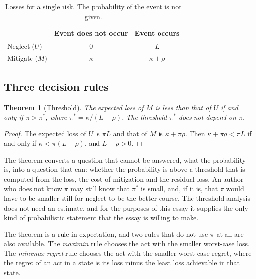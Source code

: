 \documentclass[11pt]{article}
\theoremstyle{plain}
\newtheorem{theorem}{Theorem}[section]
\theoremstyle{definition}
\theoremstyle{remark}
\begin{document}
\begin{table}[ht]
\centering
\small
\begin{tabular}{@{}lcc@{}}
\toprule
 & Event does not occur & Event occurs \\
\midrule
Neglect ($U$) & $0$ & $L$ \\
Mitigate ($M$) & $\kappa$ & $\kappa+\rho$ \\
\bottomrule
\end{tabular}
\caption{Losses for a single risk. The probability of the event is not given.}
\label{tab:risk}
\end{table}

\subsection{Three decision rules}

\begin{theorem}[Threshold]\label{thm:threshold}
The expected loss of $M$ is less than that of $U$ if and only if $\pi>\pi^{*}$, where $\pi^{*}=\kappa/(L-\rho)$. The threshold $\pi^{*}$ does not depend on $\pi$.
\end{theorem}

\begin{proof}
The expected loss of $U$ is $\pi L$ and that of $M$ is $\kappa+\pi\rho$. Then $\kappa+\pi\rho<\pi L$ if and only if $\kappa<\pi(L-\rho)$, and $L-\rho>0$. \qedhere
\end{proof}

The theorem converts a question that cannot be answered, what the probability is, into a question that can: whether the probability is above a threshold that is computed from the loss, the cost of mitigation and the residual loss. An author who does not know $\pi$ may still know that $\pi^{*}$ is small, and, if it is, that $\pi$ would have to be smaller still for neglect to be the better course. The threshold analysis does not need an estimate, and for the purposes of this essay it supplies the only kind of probabilistic statement that the essay is willing to make.

The theorem is a rule in expectation, and two rules that do not use $\pi$ at all are also available. The \emph{maximin} rule chooses the act with the smaller worst-case loss. The \emph{minimax regret} rule chooses the act with the smaller worst-case regret, where the regret of an act in a state is its loss minus the least loss achievable in that state.
\end{document}
